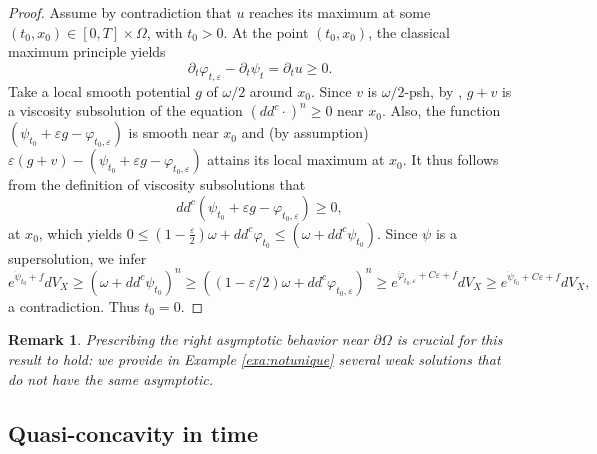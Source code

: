 \documentclass[10pt,a4paper]{amsart}
\numberwithin{equation}{section}
\newtheorem{remark}[theorem]{Remark}
\newcommand{\f}{\varphi}
\begin{document}
\begin{proof}
  Assume by contradiction that $u$ reaches its maximum at some $(t_0,x_0)\in [0,T]\times \Omega$, with  $t_0>0$. 
 At the point  $(t_0,x_0)$, the classical maximum principle yields
\[
\partial_t \varphi_{t,\varepsilon}  -\partial_t \psi_{t}=  \partial_t u \geq 0. 
\]
Take a local smooth potential $g$ of $\omega/2$ around $x_0$. Since $v$ is $\omega/2$-psh, by \cite[Proposition 1.3]{EGZ11}, $g+v$ is a viscosity subsolution of the equation $(dd^c \cdot )^n \geq 0$ near $x_0$. 
Also, the function $(\psi_{t_0} +\varepsilon g-\varphi_{t_0,\varepsilon})$ is smooth near $x_0$ and (by assumption) $\varepsilon (g+v)-(\psi_{t_0} +\varepsilon g-\varphi_{t_0,\varepsilon})$ attains its local maximum at $x_0$. It thus follows from the definition of viscosity subsolutions that 
$$
dd^c(\psi_{t_0} +\varepsilon g-\varphi_{t_0,\varepsilon})  \geq 0, 
$$
at $x_0$, which yields
$
0\leq \left(1-\frac{\varepsilon}{2}\right)\omega+dd^c \varphi_{t_0} \leq (\omega +dd^c \psi_{t_0}).
$
Since   $\psi$ is a   supersolution, we infer 
\[
e^{{\dot \psi}_{t_0}+f} dV_X \geq   (\omega +dd^c \psi_{t_0})^n \geq ((1-\varepsilon/2)\omega+dd^c \varphi_{t_0,\varepsilon})^n 
\geq e^{\dot{\varphi}_{t_0,\varepsilon}+C\varepsilon+f}dV_X \geq e^{{\dot \psi}_{t_0}+C\varepsilon+f} dV_X,
\]
a contradiction. Thus $t_0=0$.
\end{proof}



 
\begin{remark}
Prescribing the right asymptotic behavior near $\partial \Omega$ is crucial for this result to hold: we provide 
in Example \ref{exa:notunique}  several weak solutions  that do not have the same asymptotic. 
\end{remark}







\subsection{Quasi-concavity in time} \label{sec:concave}

\end{document}
